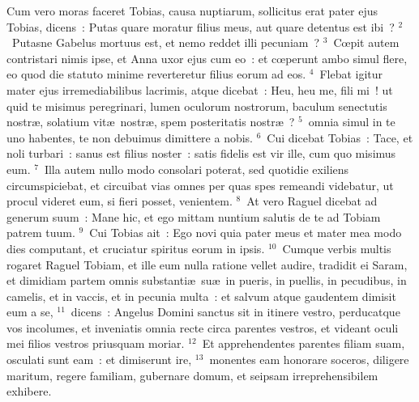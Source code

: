 \lettrine[lines=10,image=true,loversize=0.05,lraise=-0.03]{C}{}um vero moras faceret Tobias, causa nuptiarum, sollicitus erat pater ejus Tobias, dicens~: Putas quare moratur filius meus, aut quare detentus est ibi~?
${}^{2}$~Putasne Gabelus mortuus est, et nemo reddet illi pecuniam~?
${}^{3}$~Cœpit autem contristari nimis ipse, et Anna uxor ejus cum eo~: et cœperunt ambo simul flere, eo quod die statuto minime reverteretur filius eorum ad eos.
${}^{4}$~Flebat igitur mater ejus irremediabilibus lacrimis, atque dicebat~: Heu, heu me, fili mi~! ut quid te misimus peregrinari, lumen oculorum nostrorum, baculum senectutis nostr\ae , solatium vit\ae\ nostr\ae , spem posteritatis nostr\ae~?
${}^{5}$~omnia simul in te uno habentes, te non debuimus dimittere a nobis.
${}^{6}$~Cui dicebat Tobias~: Tace, et noli turbari~: sanus est filius noster~: satis fidelis est vir ille, cum quo misimus eum.
${}^{7}$~Illa autem nullo modo consolari poterat, sed quotidie exiliens circumspiciebat, et circuibat vias omnes per quas spes remeandi videbatur, ut procul videret eum, si fieri posset, venientem.
${}^{8}$~At vero Raguel dicebat ad generum suum~: Mane hic, et ego mittam nuntium salutis de te ad Tobiam patrem tuum.
${}^{9}$~Cui Tobias ait~: Ego novi quia pater meus et mater mea modo dies computant, et cruciatur spiritus eorum in ipsis.
${}^{10}$~Cumque verbis multis rogaret Raguel Tobiam, et ille eum nulla ratione vellet audire, tradidit ei Saram, et dimidiam partem omnis substanti\ae\ su\ae\ in pueris, in puellis, in pecudibus, in camelis, et in vaccis, et in pecunia multa~: et salvum atque gaudentem dimisit eum a se,
${}^{11}$~dicens~: Angelus Domini sanctus sit in itinere vestro, perducatque vos incolumes, et inveniatis omnia recte circa parentes vestros, et videant oculi mei filios vestros priusquam moriar.
${}^{12}$~Et apprehendentes parentes filiam suam, osculati sunt eam~: et dimiserunt ire,
${}^{13}$~monentes eam honorare soceros, diligere maritum, regere familiam, gubernare domum, et seipsam irreprehensibilem exhibere.

